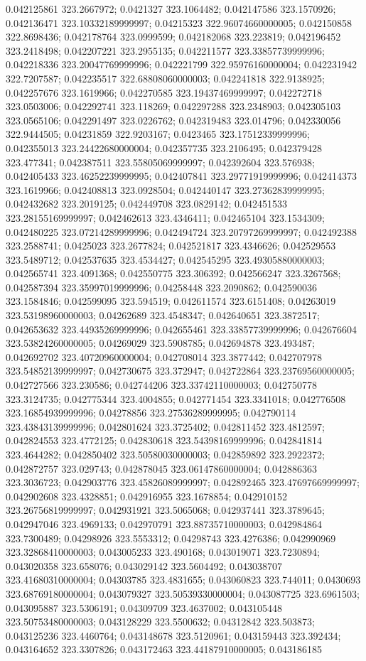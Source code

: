 0.042125861 323.2667972; 0.0421327 323.1064482; 0.042147586 323.1570926; 0.042136471 323.10332189999997; 0.04215323 322.96074660000005; 0.042150858 322.8698436; 0.042178764 323.0999599; 0.042182068 323.223819; 0.042196452 323.2418498; 0.042207221 323.2955135; 0.042211577 323.33857739999996; 0.042218336 323.20047769999996; 0.042221799 322.95976160000004; 0.042231942 322.7207587; 0.042235517 322.68808060000003; 0.042241818 322.9138925; 0.042257676 323.1619966; 0.042270585 323.19437469999997; 0.042272718 323.0503006; 0.042292741 323.118269; 0.042297288 323.2348903; 0.042305103 323.0565106; 0.042291497 323.0226762; 0.042319483 323.014796; 0.042330056 322.9444505; 0.04231859 322.9203167; 0.0423465 323.17512339999996; 0.042355013 323.24422680000004; 0.042357735 323.2106495; 0.042379428 323.477341; 0.042387511 323.55805069999997; 0.042392604 323.576938; 0.042405433 323.46252239999995; 0.042407841 323.29771919999996; 0.042414373 323.1619966; 0.042408813 323.0928504; 0.042440147 323.27362839999995; 0.042432682 323.2019125; 0.042449708 323.0829142; 0.042451533 323.28155169999997; 0.042462613 323.4346411; 0.042465104 323.1534309; 0.042480225 323.07214289999996; 0.042494724 323.20797269999997; 0.042492388 323.2588741; 0.0425023 323.2677824; 0.042521817 323.4346626; 0.042529553 323.5489712; 0.042537635 323.4534427; 0.042545295 323.49305880000003; 0.042565741 323.4091368; 0.042550775 323.306392; 0.042566247 323.3267568; 0.042587394 323.35997019999996; 0.04258448 323.2090862; 0.042590036 323.1584846; 0.042599095 323.594519; 0.042611574 323.6151408; 0.04263019 323.53198960000003; 0.04262689 323.4548347; 0.042640651 323.3872517; 0.042653632 323.44935269999996; 0.042655461 323.33857739999996; 0.042676604 323.53824260000005; 0.04269029 323.5908785; 0.042694878 323.493487; 0.042692702 323.40720960000004; 0.042708014 323.3877442; 0.042707978 323.54852139999997; 0.042730675 323.372947; 0.042722864 323.23769560000005; 0.042727566 323.230586; 0.042744206 323.33742110000003; 0.042750778 323.3124735; 0.042775344 323.4004855; 0.042771454 323.3341018; 0.042776508 323.16854939999996; 0.04278856 323.27536289999995; 0.042790114 323.43843139999996; 0.042801624 323.3725402; 0.042811452 323.4812597; 0.042824553 323.4772125; 0.042830618 323.54398169999996; 0.042841814 323.4644282; 0.042850402 323.50580030000003; 0.042859892 323.2922372; 0.042872757 323.029743; 0.042878045 323.06147860000004; 0.042886363 323.3036723; 0.042903776 323.45826089999997; 0.042892465 323.47697669999997; 0.042902608 323.4328851; 0.042916955 323.1678854; 0.042910152 323.26756819999997; 0.042931921 323.5065068; 0.042937441 323.3789645; 0.042947046 323.4969133; 0.042970791 323.88735710000003; 0.042984864 323.7300489; 0.04298926 323.5553312; 0.04298743 323.4276386; 0.042990969 323.32868410000003; 0.043005233 323.490168; 0.043019071 323.7230894; 0.043020358 323.658076; 0.043029142 323.5604492; 0.043038707 323.41680310000004; 0.04303785 323.4831655; 0.043060823 323.744011; 0.0430693 323.68769180000004; 0.043079327 323.50539330000004; 0.043087725 323.6961503; 0.043095887 323.5306191; 0.04309709 323.4637002; 0.043105448 323.50753480000003; 0.043128229 323.5500632; 0.04312842 323.503873; 0.043125236 323.4460764; 0.043148678 323.5120961; 0.043159443 323.392434; 0.043164652 323.3307826; 0.043172463 323.44187910000005; 0.043186185 